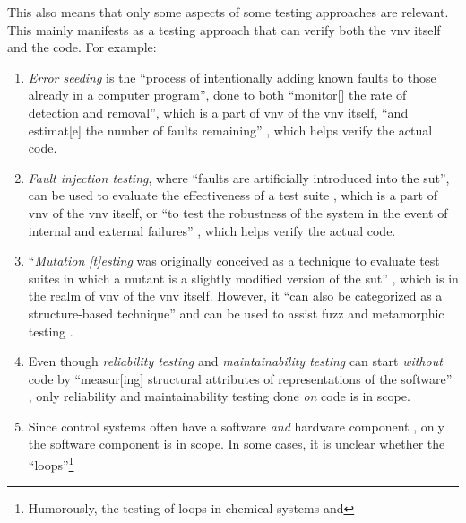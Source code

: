 This also means that only some aspects of some testing approaches are relevant.
This mainly manifests as a testing approach that can verify both the \acs{vnv}
itself and the code. For example:

\begin{enumerate}
      \item \emph{Error seeding} is the ``process of intentionally adding
            known faults to those already in a computer program'',
            done to both ``monitor[] the rate of detection and removal'',
            which is a part of \acs{vnv} of the \acs{vnv} itself, ``and
            estimat[e] the number of faults remaining''
            \citep[p.~165]{IEEE2017}, which helps verify the actual code.
      \item \emph{Fault injection testing}, where ``faults are artificially
            introduced into the \acs{sut}'', can be used to evaluate the
            effectiveness of a test suite \citep[p.~5-18]{SWEBOK2024},
            which is a part of \acs{vnv} of the \acs{vnv} itself, or ``to test
            the robustness of the system in the event of internal and
            external failures'' \citep[p.~42]{IEEE2022}, which helps verify
            the actual code.
      \item ``\emph{Mutation [t]esting} was originally conceived as a
            technique to evaluate test suites in which a mutant is a slightly
            modified version of the \acs{sut}'' \citep[p.~5-15]{SWEBOK2024},
            which is in the realm of \acs{vnv} of the \acs{vnv} itself.
            However, it ``can also be categorized as a structure-based
            technique'' and can be used to assist fuzz and metamorphic testing
            \citep[p.~5-15]{SWEBOK2024}.
      \item Even though \emph{reliability testing} and \emph{maintainability
                  testing} can start \emph{without} code by ``measur[ing]
            structural attributes of representations of the software''
            \citep[p.~18]{FentonAndPfleeger1997}, only reliability and
            maintainability testing done \emph{on} code is in scope.
      \item Since control systems often have a software \emph{and} hardware
            component \citep{ISO2015, PreußeEtAl2012,ForsythEtAl2004},
            only the software component is in scope. In some cases, it is
            unclear whether the ``loops''\footnote{Humorously, the testing of
                  loops in chemical systems \citep{Dominguez-PumarEtAl2020} and
}
\end{enumerate}
